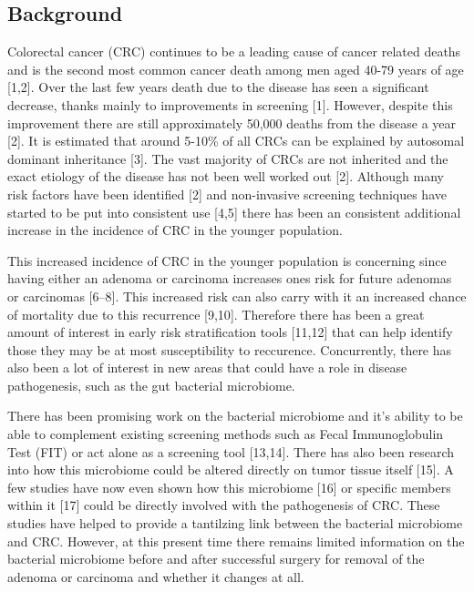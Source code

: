 \documentclass[12pt,]{article}
\begin{document}
\subsection{Background}\label{background}

Colorectal cancer (CRC) continues to be a leading cause of cancer
related deaths and is the second most common cancer death among men aged
40-79 years of age {[}1,2{]}. Over the last few years death due to the
disease has seen a significant decrease, thanks mainly to improvements
in screening {[}1{]}. However, despite this improvement there are still
approximately 50,000 deaths from the disease a year {[}2{]}. It is
estimated that around 5-10\% of all CRCs can be explained by autosomal
dominant inheritance {[}3{]}. The vast majority of CRCs are not
inherited and the exact etiology of the disease has not been well worked
out {[}2{]}. Although many risk factors have been identified {[}2{]} and
non-invasive screening techniques have started to be put into consistent
use {[}4,5{]} there has been an consistent additional increase in the
incidence of CRC in the younger population.

This increased incidence of CRC in the younger population is concerning
since having either an adenoma or carcinoma increases ones risk for
future adenomas or carcinomas {[}6--8{]}. This increased risk can also
carry with it an increased chance of mortality due to this recurrence
{[}9,10{]}. Therefore there has been a great amount of interest in early
risk stratification tools {[}11,12{]} that can help identify those they
may be at most susceptibility to reccurence. Concurrently, there has
also been a lot of interest in new areas that could have a role in
disease pathogenesis, such as the gut bacterial microbiome.

There has been promising work on the bacterial microbiome and it's
ability to be able to complement existing screening methods such as
Fecal Immunoglobulin Test (FIT) or act alone as a screening tool
{[}13,14{]}. There has also been research into how this microbiome could
be altered directly on tumor tissue itself {[}15{]}. A few studies have
now even shown how this microbiome {[}16{]} or specific members within
it {[}17{]} could be directly involved with the pathogenesis of CRC.
These studies have helped to provide a tantilzing link between the
bacterial microbiome and CRC. However, at this present time there
remains limited information on the bacterial microbiome before and after
successful surgery for removal of the adenoma or carcinoma and whether
it changes at all.
\end{document}
